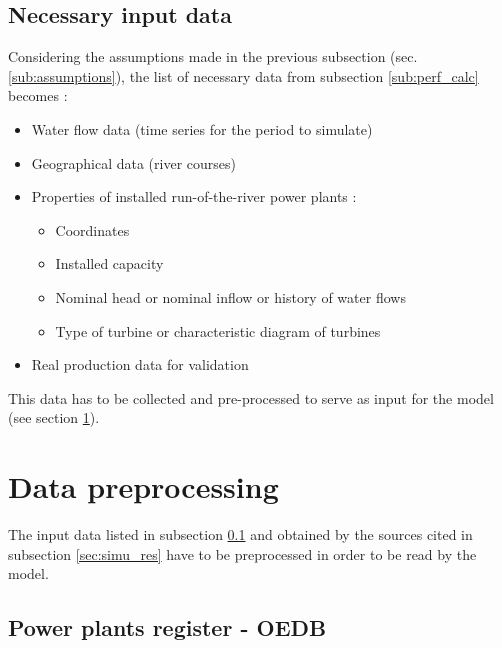 \subsection{Necessary input data}
\label{sub:collec_data}

Considering the assumptions made in the previous subsection (sec. \ref{sub:assumptions}), the list of necessary data from subsection \ref{sub:perf_calc} becomes :
\begin{itemize}
 \item Water flow data (time series for the period to simulate)
 \item Geographical data (river courses)
 \item Properties of installed run-of-the-river power plants :
 \begin{itemize}
  \item Coordinates
  \item Installed capacity
  \item Nominal head or nominal inflow or history of water flows
  \item Type of turbine or characteristic diagram of turbines
 \end{itemize}
 \item Real production data for validation
\end{itemize}

This data has to be collected and pre-processed to serve as input for the model (see section \ref{sec:data_preproc}).

\section{Data preprocessing}
\label{sec:data_preproc}
The input data listed in subsection \ref{sub:collec_data} and obtained by the sources cited in subsection \ref{sec:simu_res} have to be preprocessed in order to be read by the model.

\subsection{Power plants register - OEDB}

